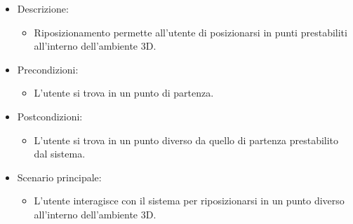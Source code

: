 \begin{itemize}

	\item Descrizione:
	\begin{itemize}
		\item Riposizionamento permette all'utente di posizionarsi in punti prestabiliti all'interno dell'ambiente 3D.
	\end{itemize}
	
	\item Precondizioni:
	\begin{itemize}
		\item L'utente si trova in un punto di partenza.
	\end{itemize}
	
	\item Postcondizioni:
	\begin{itemize}
		\item L'utente si trova in un punto diverso da quello di partenza prestabilito dal sistema.
	\end{itemize}
	
	\item Scenario principale:
	\begin{itemize}
		\item L'utente interagisce con il sistema per riposizionarsi in un punto diverso all'interno dell'ambiente 3D.
	\end{itemize}
	
\end{itemize}

